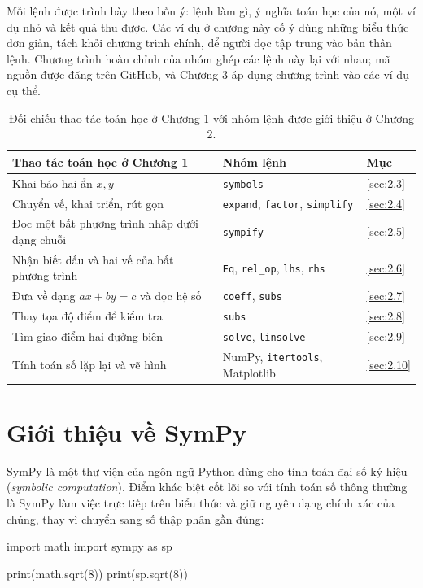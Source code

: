 \documentclass[12pt,a4paper]{report}
\begin{document}
Mỗi lệnh được trình bày theo bốn ý: lệnh làm gì, ý nghĩa toán học của nó, một ví dụ nhỏ và kết quả thu được. Các ví dụ ở chương này cố ý dùng những biểu thức đơn giản, tách khỏi chương trình chính, để người đọc tập trung vào bản thân lệnh. Chương trình hoàn chỉnh của nhóm ghép các lệnh này lại với nhau; mã nguồn được đăng trên GitHub, và Chương 3 áp dụng chương trình vào các ví dụ cụ thể.

\begin{table}[htbp]
\centering
\small
\begin{tabular}{@{}p{6.4cm}p{5.6cm}p{1.6cm}@{}}
\toprule
Thao tác toán học ở Chương 1 & Nhóm lệnh & Mục \\
\midrule
Khai báo hai ẩn $x,y$ & \texttt{symbols} & \ref{sec:2.3} \\
Chuyển vế, khai triển, rút gọn & \texttt{expand}, \texttt{factor}, \texttt{simplify} & \ref{sec:2.4} \\
Đọc một bất phương trình nhập dưới dạng chuỗi & \texttt{sympify} & \ref{sec:2.5} \\
Nhận biết dấu và hai vế của bất phương trình & \texttt{Eq}, \texttt{rel\_op}, \texttt{lhs}, \texttt{rhs} & \ref{sec:2.6} \\
Đưa về dạng $ax+by=c$ và đọc hệ số & \texttt{coeff}, \texttt{subs} & \ref{sec:2.7} \\
Thay tọa độ điểm để kiểm tra & \texttt{subs} & \ref{sec:2.8} \\
Tìm giao điểm hai đường biên & \texttt{solve}, \texttt{linsolve} & \ref{sec:2.9} \\
Tính toán số lặp lại và vẽ hình & NumPy, \texttt{itertools}, Matplotlib & \ref{sec:2.10} \\
\bottomrule
\end{tabular}
\caption{Đối chiếu thao tác toán học ở Chương 1 với nhóm lệnh được giới thiệu ở Chương 2.}
\label{tab:ban-do-lenh}
\end{table}

\section{Giới thiệu về SymPy}
\label{sec:2.1}

SymPy là một thư viện của ngôn ngữ Python dùng cho tính toán đại số ký hiệu (\textit{symbolic computation}). Điểm khác biệt cốt lõi so với tính toán số thông thường là SymPy làm việc trực tiếp trên biểu thức và giữ nguyên dạng chính xác của chúng, thay vì chuyển sang số thập phân gần đúng:

\begin{madoanbox}
import math
import sympy as sp

print(math.sqrt(8))
print(sp.sqrt(8))
\end{madoanbox}
\end{document}
